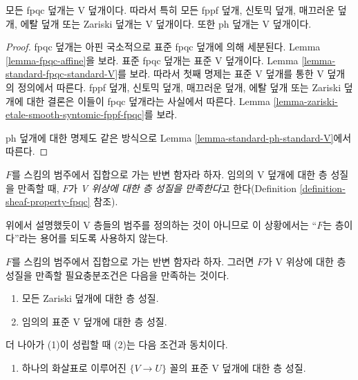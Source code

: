 \begin{lemma}
\label{lemma-zariski-etale-smooth-syntomic-fppf-fpqc-ph-V}
모든 fpqc 덮개는 V 덮개이다. 따라서 특히 모든 fppf 덮개, 신토믹 덮개,
매끄러운 덮개, \'에탈 덮개 또는 Zariski 덮개는 V 덮개이다. 또한 ph 덮개는
V 덮개이다.
\end{lemma}

\begin{proof}
fpqc 덮개는 아핀 국소적으로 표준 fpqc 덮개에 의해 세분된다. Lemma
\ref{lemma-fpqc-affine}을 보라. 표준 fpqc 덮개는 표준 V 덮개이다. Lemma
\ref{lemma-standard-fpqc-standard-V}를 보라. 따라서 첫째 명제는 표준 V
덮개를 통한 V 덮개의 정의에서 따른다. fppf 덮개, 신토믹 덮개, 매끄러운
덮개, \'에탈 덮개 또는 Zariski 덮개에 대한 결론은 이들이 fpqc 덮개라는
사실에서 따른다. Lemma
\ref{lemma-zariski-etale-smooth-syntomic-fppf-fpqc}를 보라.

\medskip\noindent
ph 덮개에 대한 명제도 같은 방식으로 Lemma
\ref{lemma-standard-ph-standard-V}에서 따른다.
\end{proof}

\begin{definition}
\label{definition-sheaf-property-V}
$F$를 스킴의 범주에서 집합으로 가는 반변 함자라 하자. 임의의 V 덮개에
대한 층 성질을 만족할 때, $F$가
{\it V 위상에 대한 층 성질을 만족한다}고 한다(Definition
\ref{definition-sheaf-property-fpqc} 참조).
\end{definition}

\noindent
위에서 설명했듯이 V 층들의 범주를 정의하는 것이 아니므로 이 상황에서는
``$F$는 층이다''라는 용어를 되도록 사용하지 않는다.

\begin{lemma}
\label{lemma-sheaf-property-V}
$F$를 스킴의 범주에서 집합으로 가는 반변 함자라 하자. 그러면 $F$가 V
위상에 대한 층 성질을 만족할 필요충분조건은 다음을 만족하는 것이다.
\begin{enumerate}
\item 모든 Zariski 덮개에 대한 층 성질.
\item 임의의 표준 V 덮개에 대한 층 성질.
\end{enumerate}
더 나아가 (1)이 성립할 때 (2)는 다음 조건과 동치이다.
\begin{enumerate}
\item[(2')] 하나의 화살표로 이루어진 $\{V \to U\}$ 꼴의 표준 V 덮개에
대한 층 성질.
\end{enumerate}
\end{lemma}

